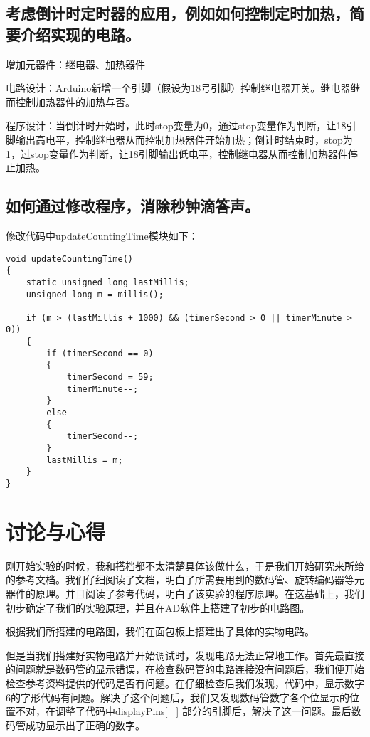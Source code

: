 \documentclass{../source/Experiment}
\begin{document}
    \subsection{考虑倒计时定时器的应用，例如如何控制定时加热，简要介绍实现的电路。}

    增加元器件：继电器、加热器件

    电路设计：Arduino新增一个引脚（假设为18号引脚）控制继电器开关。继电器继而控制加热器件的加热与否。

    程序设计：当倒计时开始时，此时stop变量为0，通过stop变量作为判断，让18引脚输出高电平，控制继电器从而控制加热器件开始加热；倒计时结束时，stop为1，过stop变量作为判断，让18引脚输出低电平，控制继电器从而控制加热器件停止加热。
    \subsection{如何通过修改程序，消除秒钟滴答声。}
    修改代码中updateCountingTime模块如下：


    \begin{lstlisting}[name = 修改后的代码]
void updateCountingTime()
{
    static unsigned long lastMillis;
    unsigned long m = millis();

    if (m > (lastMillis + 1000) && (timerSecond > 0 || timerMinute > 0))
    {
        if (timerSecond == 0)
        {
            timerSecond = 59;
            timerMinute--;
        }
        else
        {
            timerSecond--;
        }
        lastMillis = m;
    }
}
    \end{lstlisting}
    \section{讨论与心得}
    刚开始实验的时候，我和搭档都不太清楚具体该做什么，于是我们开始研究来所给的参考文档。我们仔细阅读了文档，明白了所需要用到的数码管、旋转编码器等元器件的原理。并且阅读了参考代码，明白了该实验的程序原理。在这基础上，我们初步确定了我们的实验原理，并且在AD软件上搭建了初步的电路图。

    根据我们所搭建的电路图，我们在面包板上搭建出了具体的实物电路。

    但是当我们搭建好实物电路并开始调试时，发现电路无法正常地工作。首先最直接的问题就是数码管的显示错误，在检查数码管的电路连接没有问题后，我们便开始检查参考资料提供的代码是否有问题。在仔细检查后我们发现，代码中，显示数字6的字形代码有问题。解决了这个问题后，我们又发现数码管数字各个位显示的位置不对，在调整了代码中displayPins[ \, ] 部分的引脚后，解决了这一问题。最后数码管成功显示出了正确的数字。
\end{document}
